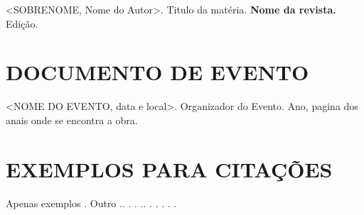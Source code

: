 <SOBRENOME, Nome do Autor>. Titulo da matéria. \textbf{Nome da
revista.} Edição.

\section{DOCUMENTO DE EVENTO}

<NOME DO EVENTO, data e local>. Organizador do Evento. Ano,
pagina dos anais onde se encontra a obra. 

\section{EXEMPLOS PARA CITAÇÕES}

Apenas exemplos \cite{7.1.3-1}. Outro \cite{NBR6023:2000}.\cite{NBR10520:1988}. \cite{7.3.2-2}. \cite{7.4.2.1-3}. \cite{7.4.2.1-2}.\cite{7.4.2.3-5}. \cite{7.4.2.1-4}. 
\cite{7.7.1.2-5}. \cite{7.7.1.2-2}. \cite{7.4.2.3-6}. \cite{8.1.1.5}.
